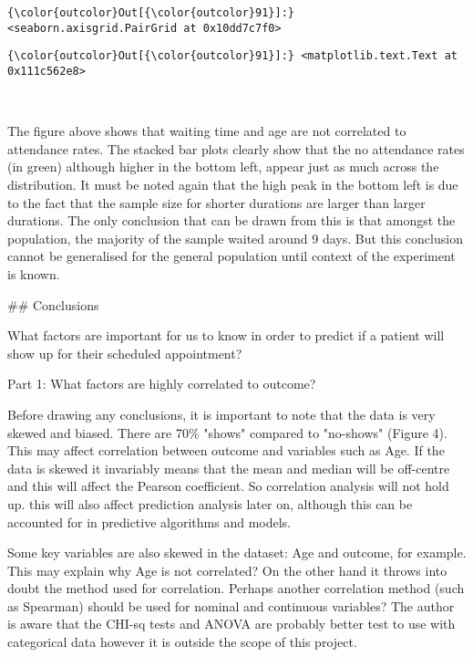 \documentclass[11pt]{article}
\begin{document}
\begin{Verbatim}[commandchars=\\\{\}]
{\color{outcolor}Out[{\color{outcolor}91}]:} <seaborn.axisgrid.PairGrid at 0x10dd7c7f0>
\end{Verbatim}
            
\begin{Verbatim}[commandchars=\\\{\}]
{\color{outcolor}Out[{\color{outcolor}91}]:} <matplotlib.text.Text at 0x111c562e8>
\end{Verbatim}
            
    \begin{center}
    \end{center}
    { \hspace*{\fill} \\}
    
    The figure above shows that waiting time and age are not correlated to
attendance rates. The stacked bar plots clearly show that the no
attendance rates (in green) although higher in the bottom left, appear
just as much across the distribution. It must be noted again that the
high peak in the bottom left is due to the fact that the sample size for
shorter durations are larger than larger durations. The only conclusion
that can be drawn from this is that amongst the population, the majority
of the sample waited around 9 days. But this conclusion cannot be
generalised for the general population until context of the experiment
is known.

     \#\# Conclusions

    What factors are important for us to know in order to predict if a
patient will show up for their scheduled appointment?

Part 1: What factors are highly correlated to outcome?

Before drawing any conclusions, it is important to note that the data is
very skewed and biased. There are 70\% "shows" compared to "no-shows"
(Figure 4). This may affect correlation between outcome and variables
such as Age. If the data is skewed it invariably means that the mean and
median will be off-centre and this will affect the Pearson coefficient.
So correlation analysis will not hold up. this will also affect
prediction analysis later on, although this can be accounted for in
predictive algorithms and models.

Some key variables are also skewed in the dataset: Age and outcome, for
example. This may explain why Age is not correlated? On the other hand
it throws into doubt the method used for correlation. Perhaps another
correlation method (such as Spearman) should be used for nominal and
continuous variables? The author is aware that the CHI-sq tests and
ANOVA are probably better test to use with categorical data however it
is outside the scope of this project.
\end{document}
